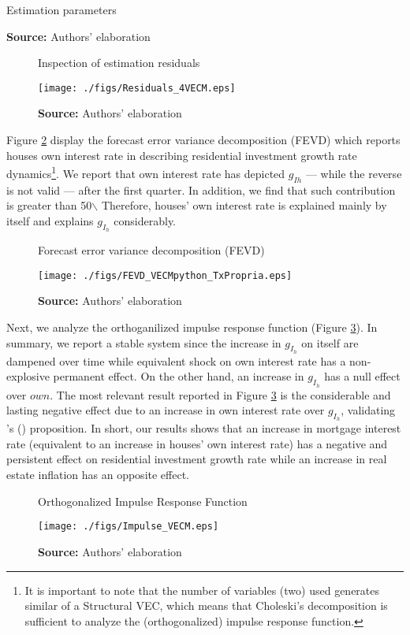 \documentclass[11pt]{article}
\begin{document}
\begin{table}[h!]
	\caption{Estimation parameters}
	\centering
	
	\caption*{\textbf{Source:} Authors' elaboration}
\end{table}

\begin{figure}
	\centering
	\caption{Inspection of estimation residuals}
	\label{residuos}
	\texttt{[image: ./figs/Residuals\_4VECM.eps]}
	\caption*{\textbf{Source:} Authors' elaboration}
\end{figure}

Figure \ref{fevd} display the forecast error variance decomposition (FEVD) which reports houses own interest rate in describing residential investment growth rate dynamics\footnote{It is important to note that the number of variables (two) used generates similar  of a Structural VEC, which means that Choleski's decomposition is sufficient to analyze the (orthogonalized) impulse response function.}.
We report that own interest rate has  depicted  \(g_{Ih}\) --- while the reverse is not valid --- after the first quarter.
In addition, we find that such contribution is greater than 50$\backslash$%
Therefore, houses' own interest rate is explained mainly by itself and explains \(g_{I_h}\) considerably.

\begin{figure}[H]
	\centering
	\caption{Forecast error variance decomposition (FEVD)}
	\label{fevd}
	\texttt{[image: ./figs/FEVD\_VECMpython\_TxPropria.eps]}
	\caption*{\textbf{Source:} Authors' elaboration}
\end{figure}

Next, we analyze the orthoganilized impulse response function (Figure \ref{irf}).
In summary, we report a stable system since the increase in \(g_{I_h}\) on itself are dampened over time while equivalent shock on own interest rate has a non-explosive permanent effect.
On the other hand, an increase in \(g_{I_h}\) has a null effect over \(own\).
The most relevant result reported in Figure \ref{irf} is the considerable and lasting negative effect due to an increase in own interest rate over \(g_{I_h}\), validating \citeauthor{teixeira_crescimento_2015}'s (\citeyear{teixeira_crescimento_2015}) proposition.
In short, our results shows that an increase in mortgage interest rate (equivalent to an increase in houses' own interest rate) has a negative and persistent effect on residential investment growth rate while an increase in real estate inflation  has an opposite effect.
\begin{figure}[H]
	\centering
	\caption{Orthogonalized Impulse Response Function}
	\label{irf}
	\texttt{[image: ./figs/Impulse\_VECM.eps]}
	\caption*{\textbf{Source:} Authors' elaboration}
\end{figure}
\end{document}
